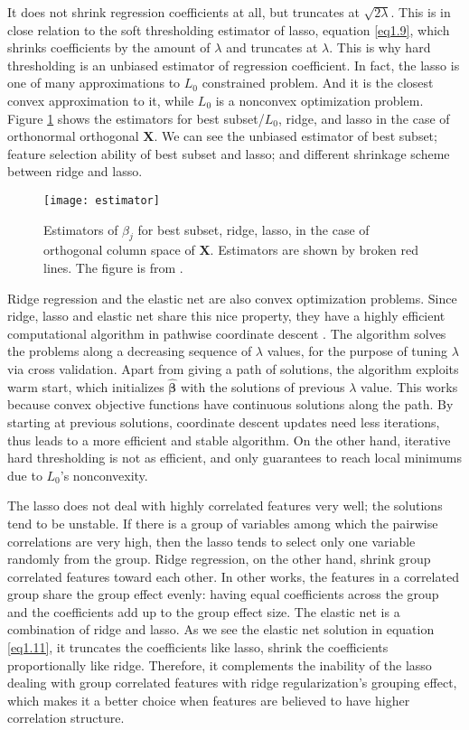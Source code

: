 It does not shrink regression coefficients at all, but truncates at $\sqrt{2\lambda}$. This is in close relation to the soft thresholding estimator of lasso, equation \eqref{eq1.9}, which shrinks coefficients by the amount of $\lambda$ and truncates at $\lambda$. This is why hard thresholding is an unbiased estimator of regression coefficient. In fact, the lasso is one of many approximations to $L_0$ constrained problem. And it is the closest convex approximation to it, while $L_0$ is a nonconvex optimization problem. Figure \ref{fig:estimators} shows the estimators for best subset/$L_0$, ridge, and lasso in the case of orthonormal orthogonal $\bm{X}$. We can see the unbiased estimator of best subset; feature selection ability of best subset and lasso; and different shrinkage scheme between ridge and lasso.
\begin{figure}[tbh]
  \centering
  \texttt{[image: estimator]}
  \caption[Estimators of $\beta_j$ in the case of orthonormal columns of $\bm{X}$]{
    Estimators of $\beta_j$ for best subset, ridge, lasso, in the case of orthogonal column space of $\bm{X}$. Estimators are shown by broken red lines. The figure is from \cite{hastie2009elements}.
  }
  \label{fig:estimators}
\end{figure}

Ridge regression and the elastic net are also convex optimization problems. Since ridge, lasso and elastic net share this nice property, they have a highly efficient computational algorithm in pathwise coordinate descent \citep{friedman2007pathwise}. The algorithm solves the problems along a decreasing sequence of $\lambda$ values, for the purpose of tuning $\lambda$ via cross validation. Apart from giving a path of solutions, the algorithm exploits warm start, which initializes $\hat{\bm{\beta}}$ with the solutions of previous $\lambda$ value. This works because convex objective functions have continuous solutions along the path. By starting at previous solutions, coordinate descent updates need less iterations, thus leads to a more efficient and stable algorithm. On the other hand, iterative hard thresholding is not as efficient, and only guarantees to reach local minimums due to $L_0$'s nonconvexity. 

The lasso does not deal with highly correlated features very well; the solutions tend to be unstable. If there is a group of variables among which the pairwise correlations are very high, then the lasso tends to select only one variable randomly from the group. Ridge regression, on the other hand, shrink group correlated features toward each other. In other works, the features in a correlated group share the group effect evenly: having equal coefficients across the group and the coefficients add up to the group effect size. The elastic net is a combination of ridge and lasso. As we see the elastic net solution in equation \eqref{eq1.11}, it truncates the coefficients like lasso, shrink the coefficients proportionally like ridge. Therefore, it complements the inability of the lasso dealing with group correlated features with ridge regularization's grouping effect, which makes it a better choice when features are believed to have higher correlation structure.

